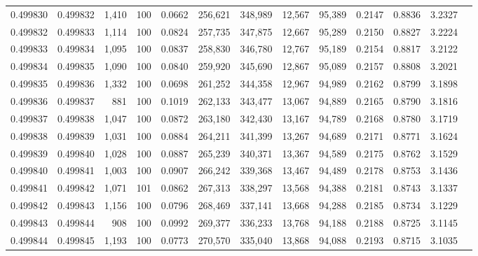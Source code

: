 \begin{tabular}{rrrrrrrrrrrrr}
0.499830 & 0.499832 & 1,410 & 100 &                                     0.0662 & 256,621 & 348,989 &  12,567 &  95,389 & 0.2147 & 0.8836 & 3.2327 \\
0.499832 & 0.499833 & 1,114 & 100 &                                     0.0824 & 257,735 & 347,875 &  12,667 &  95,289 & 0.2150 & 0.8827 & 3.2224 \\
0.499833 & 0.499834 & 1,095 & 100 &                                     0.0837 & 258,830 & 346,780 &  12,767 &  95,189 & 0.2154 & 0.8817 & 3.2122 \\
0.499834 & 0.499835 & 1,090 & 100 &                                     0.0840 & 259,920 & 345,690 &  12,867 &  95,089 & 0.2157 & 0.8808 & 3.2021 \\
0.499835 & 0.499836 & 1,332 & 100 &                                     0.0698 & 261,252 & 344,358 &  12,967 &  94,989 & 0.2162 & 0.8799 & 3.1898 \\
0.499836 & 0.499837 &   881 & 100 &                                     0.1019 & 262,133 & 343,477 &  13,067 &  94,889 & 0.2165 & 0.8790 & 3.1816 \\
0.499837 & 0.499838 & 1,047 & 100 &                                     0.0872 & 263,180 & 342,430 &  13,167 &  94,789 & 0.2168 & 0.8780 & 3.1719 \\
0.499838 & 0.499839 & 1,031 & 100 &                                     0.0884 & 264,211 & 341,399 &  13,267 &  94,689 & 0.2171 & 0.8771 & 3.1624 \\
0.499839 & 0.499840 & 1,028 & 100 &                                     0.0887 & 265,239 & 340,371 &  13,367 &  94,589 & 0.2175 & 0.8762 & 3.1529 \\
0.499840 & 0.499841 & 1,003 & 100 &                                     0.0907 & 266,242 & 339,368 &  13,467 &  94,489 & 0.2178 & 0.8753 & 3.1436 \\
0.499841 & 0.499842 & 1,071 & 101 &                                     0.0862 & 267,313 & 338,297 &  13,568 &  94,388 & 0.2181 & 0.8743 & 3.1337 \\
0.499842 & 0.499843 & 1,156 & 100 &                                     0.0796 & 268,469 & 337,141 &  13,668 &  94,288 & 0.2185 & 0.8734 & 3.1229 \\
0.499843 & 0.499844 &   908 & 100 &                                     0.0992 & 269,377 & 336,233 &  13,768 &  94,188 & 0.2188 & 0.8725 & 3.1145 \\
0.499844 & 0.499845 & 1,193 & 100 &                                     0.0773 & 270,570 & 335,040 &  13,868 &  94,088 & 0.2193 & 0.8715 & 3.1035 \\

\end{tabular}
